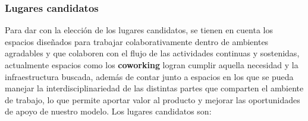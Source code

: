 {}
\subsubsection*{Lugares candidatos}


Para dar con la elección de los lugares candidatos, se tienen en cuenta los espacios diseñados para trabajar colaborativamente dentro de ambientes agradables y que colaboren con el flujo de las actividades continuas y sostenidas, actualmente espacios como los \textbf{coworking} logran cumplir aquella necesidad y la infraestructura buscada, además de contar junto a espacios en los que se pueda manejar la interdisciplinariedad de las distintas partes que comparten el ambiente de trabajo, lo que permite aportar valor al producto y mejorar las oportunidades de apoyo de nuestro modelo. Los lugares candidatos son:

